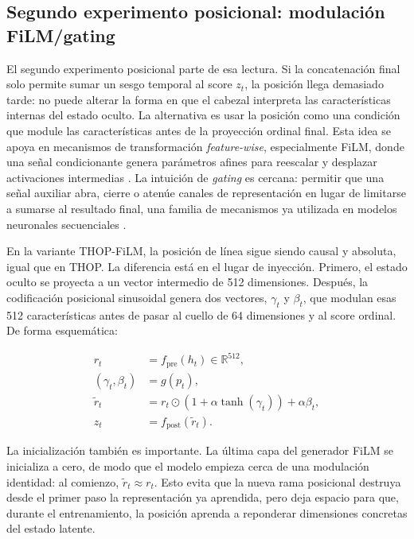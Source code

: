 \subsection{Segundo experimento posicional: modulación FiLM/gating}
\label{sec:ch6_positional_film}

El segundo experimento posicional parte de esa lectura. Si la concatenación final solo permite sumar un sesgo temporal al score $z_t$, la posición llega demasiado tarde: no puede
alterar la forma en que el cabezal interpreta las características internas del estado oculto. La alternativa es usar la posición como una condición que module las características
antes de la proyección ordinal final. Esta idea se apoya en mecanismos de transformación \textit{feature-wise}, especialmente FiLM, donde una señal condicionante genera parámetros
afines para reescalar y desplazar activaciones intermedias \citep{perez2018film}. La intuición de \textit{gating} es cercana: permitir que una señal auxiliar abra, cierre o atenúe
canales de representación en lugar de limitarse a sumarse al resultado final, una familia de mecanismos ya utilizada en modelos neuronales secuenciales \citep{dauphin2017language}.

En la variante THOP-FiLM, la posición de línea sigue siendo causal y absoluta, igual que en THOP. La diferencia está en el lugar de inyección. Primero, el estado oculto se proyecta a
un vector intermedio de 512 dimensiones. Después, la codificación posicional sinusoidal genera dos vectores, $\gamma_t$ y $\beta_t$, que modulan esas 512 características antes de
pasar al cuello de 64 dimensiones y al score ordinal. De forma esquemática:

\[
\begin{aligned}
r_t &= f_{\mathrm{pre}}(h_t) \in \mathbb{R}^{512},\\
(\gamma_t, \beta_t) &= g(p_t),\\
\tilde{r}_t &= r_t \odot \left(1 + \alpha \tanh(\gamma_t)\right) + \alpha \beta_t,\\
z_t &= f_{\mathrm{post}}(\tilde{r}_t).
\end{aligned}
\]

La inicialización también es importante. La última capa del generador FiLM se inicializa a cero, de modo que el modelo empieza cerca de una modulación identidad: al comienzo,
$\tilde{r}_t \approx r_t$. Esto evita que la nueva rama posicional destruya desde el primer paso la representación ya aprendida, pero deja espacio para que, durante el entrenamiento,
la posición aprenda a reponderar dimensiones concretas del estado latente.

